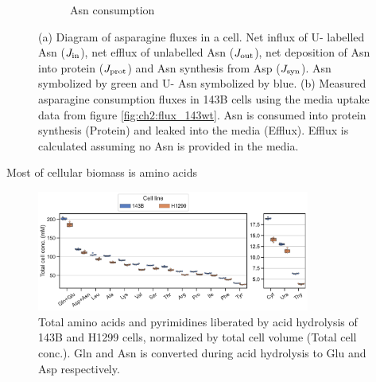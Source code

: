 \begin{figure}
\begin{subfigure}[b]{0.4\textwidth}
         \caption{Asn consumption}
         \label{fig:ch2:Asn_flux}
     \end{subfigure}
     \hspace{0.05\textwidth}
        \caption[Asparagine consumption fluxes]{
        (a) Diagram of asparagine fluxes in a cell.
        Net influx of U-\hCi{} labelled Asn ($J_{\text{in}}$), net efflux of unlabelled Asn ($J_{\text{out}}$), net deposition of Asn into protein ($J_{\text{prot}}$) and Asn synthesis from Asp ($J_{\text{syn}}$).
        Asn symbolized by green and U-\hCi{} Asn symbolized by blue.
        (b) Measured asparagine consumption fluxes in 143B cells using the media uptake data from figure \ref{fig:ch2:flux_143wt}.
        Asn is consumed into protein synthesis (Protein) and leaked into the media (Efflux).
        Efflux is calculated assuming no Asn is provided in the media.
        }
\end{figure}



Most of cellular biomass is amino acids \cite{Hosios2016-us}

\begin{figure}
    \centering
    \includegraphics[width=0.80\textwidth]{figures/chap2/ah_cell_comp.pdf}
    \caption[Amino acid and pyrimidine total cell concentration]{
    Total amino acids and pyrimidines liberated by acid hydrolysis of 143B and H1299 cells, normalized by total cell volume (Total cell conc.).
    Gln and Asn is converted during acid hydrolysis to Glu and Asp respectively.
    }
    \label{fig:ch2:ah_cell_comp}
\end{figure}






